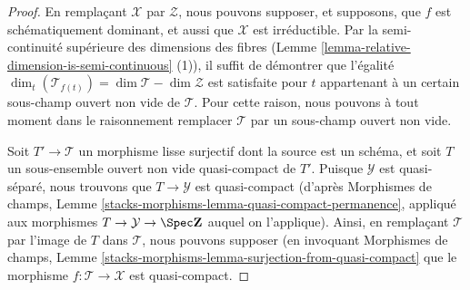 \begin{proof}
En remplaçant $\mathcal{X}$ par $\mathcal{Z}$, nous pouvons supposer, et supposons, que $f$ est
schématiquement dominant,
et aussi que $\mathcal{X}$ est irréductible.
Par la semi-continuité supérieure des dimensions des fibres
(Lemme \ref{lemma-relative-dimension-is-semi-continuous} (1)),
il suffit de démontrer que l'égalité
$\dim_t( \mathcal{T}_{f(t)}) =\dim \mathcal{T}  - \dim \mathcal{Z}$
est satisfaite pour $t$ appartenant à
un certain sous-champ ouvert non vide de $\mathcal{T}$.
Pour cette raison, nous pouvons à tout moment dans le raisonnement
remplacer $\mathcal{T}$ par un sous-champ ouvert non vide.

\medskip\noindent
Soit $T' \to \mathcal{T}$ un morphisme lisse surjectif dont la source
est un schéma, et soit $T$ un sous-ensemble ouvert non vide quasi-compact
de $T'$. Puisque $\mathcal{Y}$ est quasi-séparé, nous trouvons
que $T \to  \mathcal{Y}$ est quasi-compact
(d'après Morphismes de champs, Lemme
\ref{stacks-morphisms-lemma-quasi-compact-permanence}, appliqué aux morphismes
 $T \to \mathcal{Y} \to \Spec \mathbf{Z}$ auquel on l'applique).
Ainsi, en remplaçant $\mathcal{T}$ par l'image de $T$ dans $\mathcal{T}$,
nous pouvons supposer (en invoquant
Morphismes de champs, Lemme
\ref{stacks-morphisms-lemma-surjection-from-quasi-compact}
que le morphisme $f:\mathcal{T} \to \mathcal{X}$ est quasi-compact.


\end{proof}
